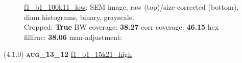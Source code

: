 \begin{figure}[h!]
\label{semimg1}
\caption*{\hyperlink{covtableaug_13_12}{\color{blue} \small \ttfamily f1\_b1\_100k11\_low}: SEM image, raw (top)/size-corrected (bottom), diam histograms, binary, grayscale.\\Cropped: {\bf True} \;\; BW coverage: {\bf 38.27} \:\: corr coverage: {\bf 46.15} \:\: hex fillfrac: {\bf 38.06} \:\: man-adjustment: {\bf \color{blue}{Yes}}}
\end{figure}
\newpage

\begin{textblock}{5}(4,1.0)
{\bf \textsc{aug\_13\_12}}
\hspace{4.5cm}
\hyperlink{covtableaug_13_12}{\color{blue} \large \ttfamily f1\_b1\_15k21\_high}
\end{textblock}

